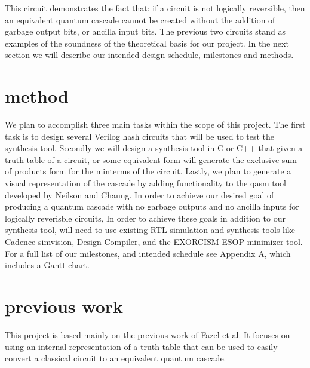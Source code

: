 \documentclass{IEEEtran}
\begin{document}
This circuit demonstrates the fact that: if a circuit is not logically reversible, then an equivalent quantum cascade cannot be created without the addition of garbage output bits, or ancilla input bits.
The previous two circuits stand as examples of the soundness of the theoretical basis for our project. In the next section we will describe our intended design schedule, milestones and methods. 

\section{method}
We plan to accomplish three main tasks within the scope of this project. 
The first task is to design several Verilog hash circuits that will be used to test the synthesis tool.
Secondly we will design a synthesis tool in C or C++ that given a truth table of a circuit, or some equivalent form will generate the exclusive sum of products form for the minterms of the circuit.
Lastly, we plan to generate a visual representation of the cascade by adding functionality to the qasm tool developed by Neilson and Chaung. \cite{qasm2circ} 
In order to achieve our desired goal of producing a quantum cascade with no garbage outputs and no ancilla inputs for logically reverisble circuits, 
In order to achieve these goals in addition to our synthesis tool, will need to use existing RTL simulation and synthesis tools like Cadence simvision, Design Compiler, and the EXORCISM ESOP minimizer tool\cite{exorcism}. 
For a full list of our milestones, and intended schedule see Appendix A, which includes a Gantt chart. 

\section{previous work}
This project is based mainly on the previous work of Fazel et al. \cite{4313212} It focuses on using an internal representation of a truth table that can be used to easily convert a classical circuit to an equivalent quantum cascade. 

{}




\end{document}
